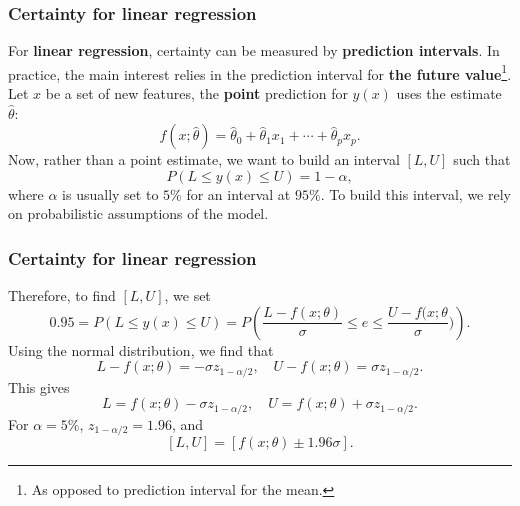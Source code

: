 \begin{frame}
\frametitle{Certainty for linear regression}
For {\bf linear regression}, certainty can be measured by {\bf prediction intervals}. In practice, the main interest relies in the prediction interval for {\bf the future value}\footnote{As opposed to prediction interval for the mean.}. \\
\vspace{0.3cm}
Let $x$ be a set of new features, the {\bf point} prediction for $y(x)$ uses the estimate $\hat{\theta}$:
$$
f(x;\hat{\theta}) = \hat{\theta}_0 + \hat{\theta}_1 x_1 + \cdots + \hat{\theta}_p x_p.
$$
Now, rather than a point estimate, we want to build an interval $[L,U]$ such that 
$$
P(L \leq y(x) \leq U) = 1-\alpha,
$$
where $\alpha$ is usually set to $5\%$ for an interval at $95\%$. To build this interval, we rely on probabilistic assumptions of the model.
\end{frame}
\begin{frame}
\frametitle{Certainty for linear regression}
Therefore, to find $[L,U]$, we set
$$
0.95 = P(L \leq y(x) \leq U) = P\left(\frac{L-f(x;\theta)}{\sigma} \leq e \leq \frac{U-f(x;\theta}{\sigma})\right).
$$
Using the normal distribution, we find that
$$
L-f(x;\theta) = -\sigma z_{1-\alpha/2}, \quad U-f(x;\theta) = \sigma z_{1-\alpha/2}.
$$
This gives 
$$
L = f(x;\theta) -\sigma z_{1-\alpha/2}, \quad U = f(x;\theta) + \sigma z_{1-\alpha/2}.
$$
For $\alpha=5\%$, $z_{1-\alpha/2}=1.96$, and 
$$
[L,U] = \left[f(x;\theta) \pm 1.96 \sigma\right].
$$
\end{frame}
